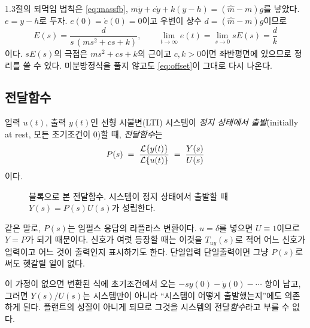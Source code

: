 \documentclass[11pt]{article}
\begin{document}
\begin{example}
1.3절의 되먹임 법칙은 \eqref{eq:massfb},
$m\ddot y+c\dot y+k(y-h)=(\hat m-m)g$를 낳았다. $e=y-h$로 두자. $e(0)=\dot e(0)=0$이고
우변이 상수 $d=(\hat m-m)g$이므로
\[
   E(s) = \frac{d}{s\,(ms^{2}+cs+k)} ,
   \qquad
   \lim_{t\to\infty} e(t) = \lim_{s\to0} sE(s) = \frac{d}{k}
\]
이다. $sE(s)$의 극점은 $ms^{2}+cs+k$의 근이고 $c,k>0$이면 좌반평면에 있으므로
정리를 쓸 수 있다. 미분방정식을 풀지 않고도 \eqref{eq:offset}이 그대로 다시
나온다.
\end{example}

\subsection{전달함수}
\begin{definition}[전달함수]\label{def:tf}
입력 $u(t)$, 출력 $y(t)$인 선형 시불변(LTI) 시스템이 \emph{정지 상태에서
출발}(initially at rest, 모든 초기조건이 0)할 때, \emph{전달함수}는
\[
   P(s) \;=\; \frac{\mathcal{L}\{y(t)\}}{\mathcal{L}\{u(t)\}} \;=\; \frac{Y(s)}{U(s)}
\]
이다.
\end{definition}

\begin{figure}[htb]
\centering
{}
\caption{블록으로 본 전달함수. 시스템이 정지 상태에서 출발할 때
$Y(s)=P(s)U(s)$가 성립한다.}
\label{fig:tfblock}
\end{figure}

같은 말로, $P(s)$는 임펄스 응답의 라플라스 변환이다. $u=\delta$를 넣으면
$U\equiv1$이므로 $Y=P$가 되기 때문이다. 신호가 여럿 등장할 때는 이것을
$T_{uy}(s)$로 적어 어느 신호가 입력이고 어느 것이 출력인지 표시하기도 한다.
단일입력 단일출력이면 그냥 $P(s)$로 써도 헷갈릴 일이 없다.

\begin{remark}
이 가정이 없으면 변환된 식에 초기조건에서 오는 $-sy(0)-\dot y(0)-\cdots$ 항이
남고, 그러면 $Y(s)/U(s)$는 시스템만이 아니라 ``시스템이 어떻게 출발했는지''에도
의존하게 된다. 플랜트의 성질이 아니게 되므로 그것을 시스템의 전달\emph{함수}라고
부를 수 없다.
\end{remark}
\end{document}
